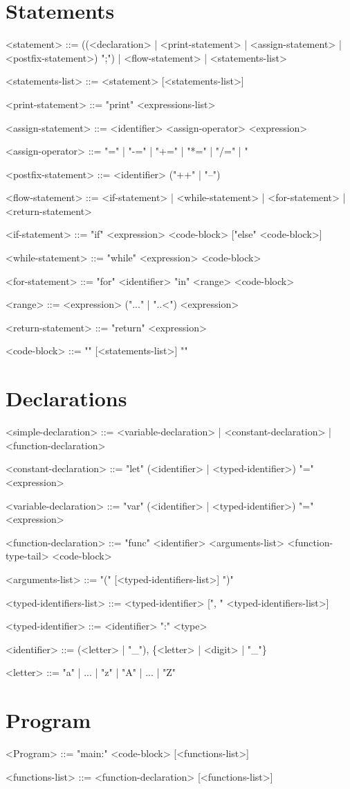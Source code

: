 \documentclass{article}
\begin{document}
\section{Statements}
\begin{grammar}
<statement> ::= ((<declaration> | <print-statement> | <assign-statement> | <postfix-statement>) ";") | <flow-statement> | <statements-list>

<statements-list> ::= <statement> [<statements-list>]

<print-statement> ::= "print" <expressions-list>

<assign-statement> ::= <identifier> <assign-operator> <expression>

<assign-operator> ::= "=" | "-=" | "+=" | "*=" | "/=" | "%

<postfix-statement> ::= <identifier> ("++" | "--")

<flow-statement> ::= <if-statement> | <while-statement> | <for-statement> | <return-statement>

<if-statement> ::= "if" <expression> <code-block> ["else" <code-block>]

<while-statement> ::= "while" <expression> <code-block>

<for-statement> ::= "for" <identifier> "in" <range> <code-block>

<range> ::= <expression> ("..." | "..<") <expression>

<return-statement> ::= "return" <expression>

<code-block> ::= "{" [<statements-list>] "}"
\end{grammar}

\section{Declarations}
\begin{grammar}
<simple-declaration> ::= <variable-declaration> | <constant-declaration> | <function-declaration>

<constant-declaration> ::= "let" (<identifier> | <typed-identifier>) "=" <expression>

<variable-declaration> ::= "var" (<identifier> | <typed-identifier>) "=" <expression>

<function-declaration> ::= "func" <identifier> <arguments-list> <function-type-tail> <code-block>

<arguments-list> ::= "(" [<typed-identifiers-list>] ")"

<typed-identifiers-list> ::= <typed-identifier> [", " <typed-identifiers-list>]

<typed-identifier> ::= <identifier> ":" <type>

<identifier> ::= (<letter> | "_"), \{<letter> | <digit> | "_"\}

<letter> ::= "a" | ... | "z" | "A" | ... | "Z"
\end{grammar}

\section{Program}
\begin{grammar}

<Program> ::= "main:" <code-block> [<functions-list>]

<functions-list> ::= <function-declaration> [<functions-list>]

\end{grammar}
\end{document}

